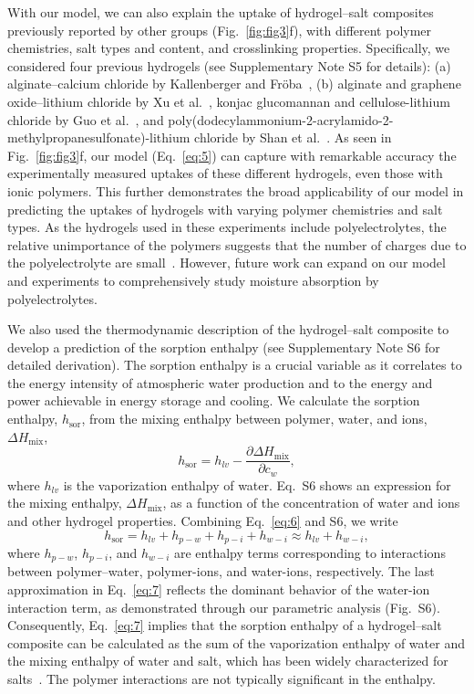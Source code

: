 \documentclass[11pt]{article}
\begin{document}
With our model, we can also explain the uptake of hydrogel--salt composites previously reported by other groups (Fig.~\ref{fig:fig3}f), with different polymer chemistries, salt types and content, and crosslinking properties. Specifically, we considered four previous hydrogels (see Supplementary Note S5 for details): (a) alginate--calcium chloride by Kallenberger and Fr\"oba~\cite{kallenberger2018}, (b) alginate and graphene oxide--lithium chloride by Xu et al.~\cite{xu2021}, konjac glucomannan and cellulose-lithium chloride by Guo et al.~\cite{guo2022}, and poly(dodecylammonium-2-acrylamido-2-methylpropanesulfonate)-lithium chloride by Shan et al.~\cite{shan2023b}. As seen in Fig.~\ref{fig:fig3}f, our model (Eq.~\ref{eq:5}) can capture with remarkable accuracy the experimentally measured uptakes of these different hydrogels, even those with ionic polymers. This further demonstrates the broad applicability of our model in predicting the uptakes of hydrogels with varying polymer chemistries and salt types. As the hydrogels used in these experiments include polyelectrolytes, the relative unimportance of the polymers suggests that the number of charges due to the polyelectrolyte are small~\cite{chen2022,english1996,brannon1991}. However, future work can expand on our model and experiments to comprehensively study moisture absorption by polyelectrolytes.

We also used the thermodynamic description of the hydrogel--salt composite to develop a prediction of the sorption enthalpy (see Supplementary Note S6 for detailed derivation). The sorption enthalpy is a crucial variable as it correlates to the energy intensity of atmospheric water production and to the energy and power achievable in energy storage and cooling. We calculate the sorption enthalpy, $h_{\mathrm{sor}}$, from the mixing enthalpy between polymer, water, and ions, $\Delta H_{\mathrm{mix}}$,
\begin{equation}
h_{\mathrm{sor}} = h_{lv} - \frac{\partial \Delta H_{\mathrm{mix}}}{\partial c_w},
\label{eq:6}
\end{equation}
where $h_{lv}$ is the vaporization enthalpy of water. Eq.~S6 shows an expression for the mixing enthalpy, $\Delta H_{\mathrm{mix}}$, as a function of the concentration of water and ions and other hydrogel properties. Combining Eq.~\ref{eq:6} and S6, we write
\begin{equation}
h_{\mathrm{sor}} = h_{lv} + h_{p-w} + h_{p-i} + h_{w-i} \approx h_{lv} + h_{w-i},
\label{eq:7}
\end{equation}
where $h_{p-w}$, $h_{p-i}$, and $h_{w-i}$ are enthalpy terms corresponding to interactions between polymer--water, polymer-ions, and water-ions, respectively. The last approximation in Eq.~\ref{eq:7} reflects the dominant behavior of the water-ion interaction term, as demonstrated through our parametric analysis (Fig.~S6). Consequently, Eq.~\ref{eq:7} implies that the sorption enthalpy of a hydrogel--salt composite can be calculated as the sum of the vaporization enthalpy of water and the mixing enthalpy of water and salt, which has been widely characterized for salts~\cite{conde2004,yuan2005}. The polymer interactions are not typically significant in the enthalpy.
\end{document}
